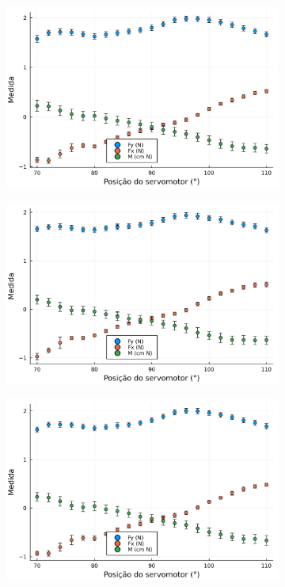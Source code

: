 \begin{figure}[htbp]
\begin{subfigure}{0.49\textwidth}
    \end{subfigure}
    \begin{subfigure}{0.49\textwidth}
        \includegraphics[width=\textwidth]{img/results/exp9_5bar_70_a_110.png}
    \end{subfigure}
    \begin{subfigure}{0.49\textwidth}
        \includegraphics[width=\textwidth]{img/results/exp10_5bar_110_a_70.png}
    \end{subfigure}
    \begin{subfigure}{0.49\textwidth}
        \includegraphics[width=\textwidth]{img/results/exp11_5bar_70_a_110.png}

\end{subfigure}
\end{figure}
